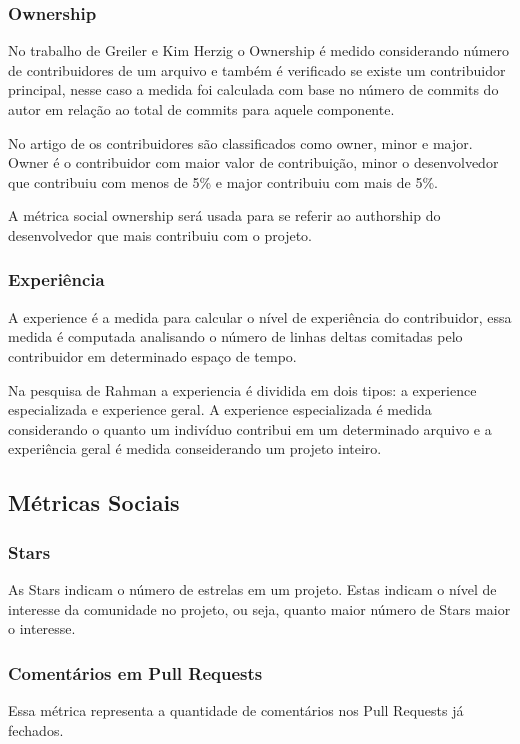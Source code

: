 \subsubsection{Ownership}
No trabalho de Greiler e Kim Herzig\cite{Greiler} o Ownership é medido considerando número de contribuidores de um arquivo e também é verificado se existe um contribuidor principal, nesse caso a medida foi calculada com base no número de commits do autor em relação ao total de commits para aquele componente.

No artigo de  os contribuidores são classificados como owner, minor e major. Owner é o contribuidor com maior valor de contribuição, minor o desenvolvedor que contribuiu com menos de 5\% e major contribuiu com mais de 5\%.

A métrica social ownership será usada para se referir ao authorship do desenvolvedor que mais contribuiu com o projeto. 

\subsubsection{Experiência}
A experience é a medida para calcular o nível de experiência do contribuidor, essa medida é computada analisando o número de linhas\cite{Rahman2011} deltas comitadas pelo contribuidor em determinado espaço de tempo.

Na pesquisa de Rahman a experiencia é dividida em dois tipos: a experience especializada e experience geral. A experience especializada é medida considerando o quanto um indivíduo contribui em um determinado arquivo e a experiência geral é medida conseiderando um projeto inteiro.

\subsection{Métricas Sociais}
\subsubsection{Stars}
As Stars indicam o número de estrelas em um projeto. Estas indicam o nível de interesse da comunidade no projeto, ou seja, quanto maior número de Stars maior o interesse.

\subsubsection{Comentários em Pull Requests}
Essa métrica representa a quantidade de comentários nos Pull Requests já fechados. 

